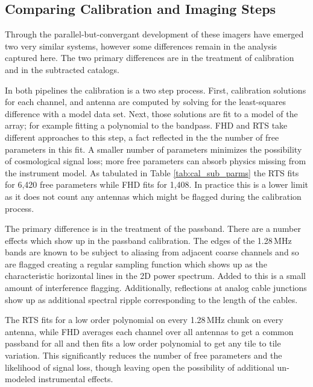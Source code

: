 \documentclass[twolcolumn,iop]{emulateapj}
\begin{document}
\subsection{Comparing Calibration and Imaging Steps}
\label{sec:comparing_imaging}
Through the parallel-but-convergant development of these imagers have emerged two very similar systems, however some differences remain in the analysis captured here. The two primary differences are in the treatment of calibration and in the subtracted catalogs.  

In both pipelines the calibration is a two step process. First, calibration solutions for each channel, and antenna are computed by solving for the least-squares difference with a model data set. Next, those solutions are fit to a model of the array; for example fitting a polynomial to the bandpass. FHD and RTS take different approaches to this step, a fact reflected in the the number of free parameters in this fit. A smaller number of parameters minimizes the possibility of cosmological signal loss; more free parameters can absorb physics missing from the instrument model.  As tabulated in Table \ref{tab:cal_sub_parms} the RTS fits for 6,420 free parameters while FHD fits for 1,408.  In practice this is a lower limit as it does not count any antennas which might be flagged during the calibration process. 

The primary difference is in the treatment of the passband.  There are a number effects which show up in the passband calibration. The edges of the 1.28\,MHz bands are known to be subject to aliasing from adjacent coarse channels and so are flagged creating a regular sampling function which shows up as the characteristic horizontal lines in the 2D power spectrum. Added to this is a small amount of interference flagging.  Additionally, reflections at analog cable junctions show up as additional spectral ripple corresponding to the length of the cables.    

The RTS fits for a low order polynomial on every 1.28\,MHz chunk on every antenna, while FHD averages each channel over all antennas to get a common passband for all and then fits a low order polynomial to get any tile to tile variation. This significantly reduces the number of free parameters and the likelihood of signal loss, though leaving open the possibility of additional un-modeled instrumental effects.
\end{document}
